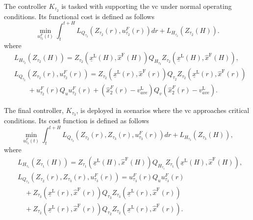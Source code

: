 The controller $K_{\tau_{2}}$ is tasked with supporting the \gls{vc} under normal operating conditions. Its functional cost is defined as follows
%
\begin{equation}
	\min_{u_{\tau_{2}}^F(t)} \int_{t}^{t+H} L_{Q_{\tau_2}}(Z_{\tau_2}(r),u_{\tau_{2}}^F(r)) dr + L_{H_{\tau_{2}}}(Z_{\tau_2}(H)).
\end{equation}
%
where
\begin{align*}
	&L_{H_{\tau_{2}}}(Z_{\tau_2}(H)) =  Z_{\tau_2}\left(\underline{x}^\mathrm{L}(H),\hat{x}^\mathrm{F}(H)\right) Q_{H_{\tau_2}} Z_{\tau_2}\left(\underline{x}^\mathrm{L}(H),\hat{x}^\mathrm{F}(H)\right), \\
	&L_{Q_{\tau_2}}(Z_{\tau_2}(r),u_{\tau_{2}}^F(r)) =  Z_{\tau_2}\left(\underline{x}^\mathrm{L}(r),\hat{x}^\mathrm{F}(r)\right) Q_{\tau_2} Z_{\tau_2}\left(\underline{x}^\mathrm{L}(r),\hat{x}^\mathrm{F}(r)\right)  \\
	& \quad \quad  + u_{\tau_{2}}^F(r)  Q_u u_{\tau_{2}}^F(r) + (\hat{x}_2^F(r)-v_{\textit{ave}}^\mathrm{L}) Q_{v} (\hat{x}_2^F(r)-v_{\textit{ave}}^\mathrm{L}).
\end{align*}

The final controller, $K_{\tau_{3}}$, is deployed in scenarios where the \gls{vc} approaches critical conditions. Its cost function is defined as follows
%
\begin{equation}
	\min_{u_{\tau_{3}}^F(t)} \int_{t}^{t+H} L_{Q_{\tau_3}}(Z_{\tau_2}(r),Z_{\tau_3}(r),u_{\tau_{3}}^F(r)) dr + L_{H_{\tau_{3}}}(Z_{\tau_3}(H)),
\end{equation}
%
where
\begin{align*}
	&L_{H_{\tau_{1}}}(Z_{\tau_1}(H)) =  Z_{\tau_1}\left(\underline{x}^\mathrm{L}(H),\hat{x}^\mathrm{F}(H)\right) Q_{H_{\tau_1}} Z_{\tau_1}\left(\underline{x}^\mathrm{L}(H),\hat{x}^\mathrm{F}(H)\right), \\
	&L_{Q_{\tau_3}}(Z_{\tau_2}(r),Z_{\tau_3}(r),u_{\tau_{3}}^F(r)) =  u_{\tau_{3}}^F(r)  Q_u u_{\tau_{3}}^F(r)  \\
	&\quad +  Z_{\tau_3}\left(\underline{x}^\mathrm{L}(r),\hat{x}^\mathrm{F}(r)\right) Q_{\tau_3} Z_{\tau_3}\left(\underline{x}^\mathrm{L}(r),\hat{x}^\mathrm{F}(r)\right) \\
	&\quad + Z_{\tau_2}\left(\underline{x}^\mathrm{L}(r),\hat{x}^\mathrm{F}(r)\right) Q_{\tau_2} Z_{\tau_2}\left(\underline{x}^\mathrm{L}(r),\hat{x}^\mathrm{F}(r)\right).
\end{align*}

